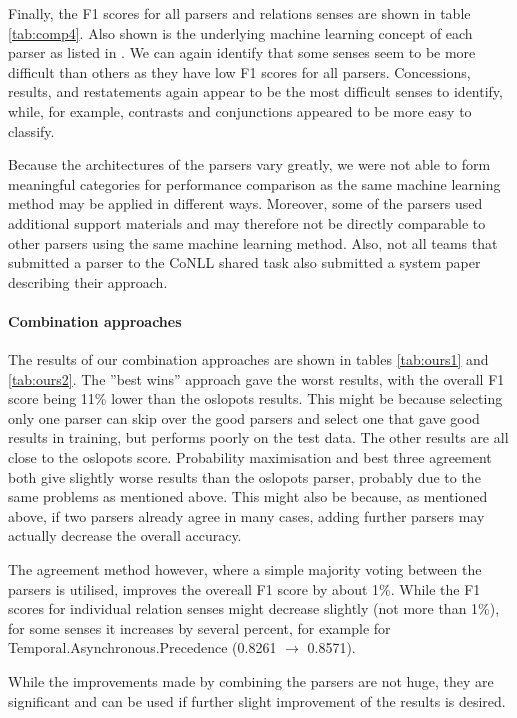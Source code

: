 \documentclass[10pt,notitlepage]{scrartcl}
\begin{document}
Finally, the F1 scores for all parsers and relations senses are shown in table \ref{tab:comp4}. Also shown is the underlying machine learning concept of each parser as listed in \cite{xue2016conll}. We can again identify that some senses seem to be more difficult than others as they have low F1 scores for all parsers. Concessions, results, and restatements again appear to be the most difficult senses to identify, while, for example, contrasts and conjunctions appeared to be more easy to classify.

Because the architectures of the parsers vary greatly, we were not able to form meaningful categories for performance comparison as the same machine learning method may be applied in different ways. Moreover, some of the parsers used additional support materials and may therefore not be directly comparable to other parsers using the same machine learning method. Also, not all teams that submitted a parser to the CoNLL shared task also submitted a system paper describing their approach.

\paragraph*{Combination approaches}

The results of our combination approaches are shown in tables \ref{tab:ours1} and \ref{tab:ours2}. The ''best wins'' approach gave the worst results, with the overall F1 score being 11\% lower than the oslopots results. This might be because selecting only one parser can skip over the good parsers and select one that gave good results in training, but performs poorly on the test data. The other results are all close to the oslopots score. Probability maximisation and best three agreement both give slightly worse results than the oslopots parser, probably due to the same problems as mentioned above. This might also be because, as mentioned above, if two parsers already agree in many cases, adding further parsers may actually decrease the overall accuracy.

The agreement method however, where a simple majority voting between the parsers is utilised, improves the overeall F1 score by about 1\%. While the F1 scores for individual relation senses might decrease slightly (not more than 1\%), for some senses it increases by several percent, for example for Temporal.Asynchronous.Precedence (0.8261 $\rightarrow$ 0.8571).

While the improvements made by combining the parsers are not huge, they are significant and can be used if further slight improvement of the results is desired.
\end{document}
